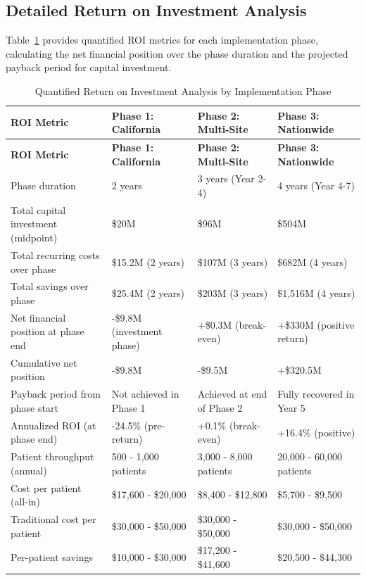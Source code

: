 \subsection{Detailed Return on Investment Analysis}
\label{subsec:financial-detailed-roi}

Table~\ref{tab:detailed-roi-analysis} provides quantified ROI metrics for
each implementation phase, calculating the net financial position over the
phase duration and the projected payback period for capital investment.

\begin{longtable}{l p{3.2cm} p{3.2cm} p{3.2cm}}
\caption{Quantified Return on Investment Analysis by Implementation Phase}
\label{tab:detailed-roi-analysis} \\
\toprule
\textbf{ROI Metric} & \textbf{Phase 1: California} & \textbf{Phase 2: Multi-Site} & \textbf{Phase 3: Nationwide} \\
\midrule
\endfirsthead
\toprule
\textbf{ROI Metric} & \textbf{Phase 1: California} & \textbf{Phase 2: Multi-Site} & \textbf{Phase 3: Nationwide} \\
\midrule
\endhead
\bottomrule
\endfoot
\bottomrule
\endlastfoot
Phase duration & 2 years & 3 years (Year 2-4) & 4 years (Year 4-7) \\
\midrule
Total capital investment (midpoint) & \$20M & \$96M & \$504M \\
\midrule
Total recurring costs over phase & \$15.2M (2 years) & \$107M (3 years) & \$682M (4 years) \\
\midrule
Total savings over phase & \$25.4M (2 years) & \$203M (3 years) & \$1,516M (4 years) \\
\midrule
Net financial position at phase end & -\$9.8M (investment phase) & +\$0.3M (break-even) & +\$330M (positive return) \\
\midrule
Cumulative net position & -\$9.8M & -\$9.5M & +\$320.5M \\
\midrule
Payback period from phase start & Not achieved in Phase 1 & Achieved at end of Phase 2 & Fully recovered in Year 5 \\
\midrule
Annualized ROI (at phase end) & -24.5\% (pre-return) & +0.1\% (break-even) & +16.4\% (positive) \\
\midrule
Patient throughput (annual) & 500 - 1,000 patients & 3,000 - 8,000 patients & 20,000 - 60,000 patients \\
\midrule
Cost per patient (all-in) & \$17,600 - \$20,000 & \$8,400 - \$12,800 & \$5,700 - \$9,500 \\
\midrule
Traditional cost per patient & \$30,000 - \$50,000 & \$30,000 - \$50,000 & \$30,000 - \$50,000 \\
\midrule
Per-patient savings & \$10,000 - \$30,000 & \$17,200 - \$41,600 & \$20,500 - \$44,300 \\
\end{longtable}

